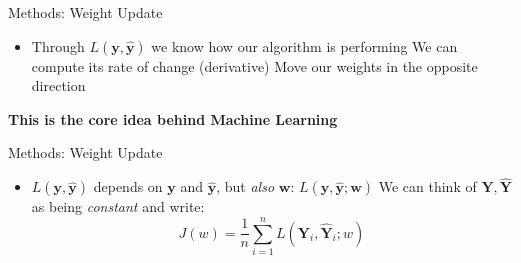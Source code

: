 \begin{slide}{Methods: Weight Update}
  \centering
\begin{itemize}
  \item Through $L(\mathbf{y}, \mathbf{\hat{y}})$ we know how our algorithm is performing
  \pitem We can compute its rate of change (derivative)
  \pitem Move our weights in the opposite direction
\end{itemize}

\pause
\vspace{1cm}
\textbf{This is the core idea behind Machine Learning}
\end{slide}

\begin{slide}{Methods: Weight Update}
  \centering
  \begin{itemize}
    \item $L(\mathbf{y}, \mathbf{\hat{y}})$ depends on $\mathbf{y}$ and $\mathbf{\hat{y}}$, but \emph{also} $\mathbf{w}$: $L(\mathbf{y}, \mathbf{\hat{y}}; \mathbf{w})$
    \pitem We can think of $\mathbf{Y}, \mathbf{\hat{Y}}$ as being \emph{constant} and write: $$J(w) = \frac{1}{n}\sum_{i=1}^n L(\mathbf{Y}_i, \mathbf{\hat{Y}}_i; w)$$
  \end{itemize}
  \vspace{0.5cm}
\end{slide}

